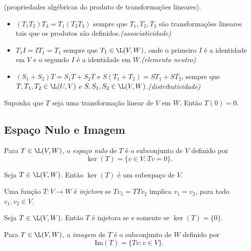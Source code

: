 \documentclass{article}
\begin{document}
\begin{prop} (propriedades algébricas do produto de transformações lineares).
    \begin{itemize}
        \item \(\left(T_1 T_2\right)T_3 = T_1\left(T_2T_3\right)\) sempre que \(T_1, T_2, T_3\) são transformações lineares tais que os produtos são definidos.\hfill\emph{(associatividade)}
        \item \(T_1I = IT_1 = T_1\) sempre que \(T_1 \in \L(V, W)\), onde o primeiro \(I\) é a identidade em \(V\) e o segundo \(I\) é a identidade em \(W\).\hfill\emph{(elemento neutro)}
        \item \(\left(S_1 + S_2\right)T = S_1T + S_2T\) e \(S\left(T_1 + T_2\right) = ST_1 + ST_2\), sempre que \(T, T_1, T_2 \in \L(U, V)\) e \(S, S_1, S_2 \in \L(V, W)\).\hfill\emph{(distributividade)}
    \end{itemize}
\end{prop}

\begin{cor}
    Suponha que \(T\) seja uma transformação linear de \(V\) em \(W\). Então \(T(0) = 0\).
\end{cor}

\subsection{Espaço Nulo e Imagem}
\begin{defn}
    Para \(T \in \L(V, W)\), o \emph{espaço nulo} de \(T\) é o subconjunto de \(V\) definido por
    \[
        \ker(T) = \{v \in V : Tv = 0\}.
    \]
\end{defn}

\begin{prop}
    Seja \(T \in \L(V, W)\). Então \(\ker(T)\) é um subespaço de \(V\).
\end{prop}

\begin{defn}
    Uma função \(T: V \to W\) é \emph{injetora} se \(Tv_1 = TTv_2\) implica \(v_1 = v_2\), para todo \(v_1, v_2 \in V\).
\end{defn}

\begin{prop}
    Seja \(T \in \L(V, W)\). Então \(T\) é injetora se e somente se \(\ker(T) = \{0\}\).
\end{prop}

\begin{defn}
    Para \(T \in \L(V, W)\), a \emph{imagem} de \(T\) é o subconjunto de \(W\) definido por
    \[
        \text{Im}(T) = \{Tv : v \in V\}.
    \]
\end{defn}
\end{document}
